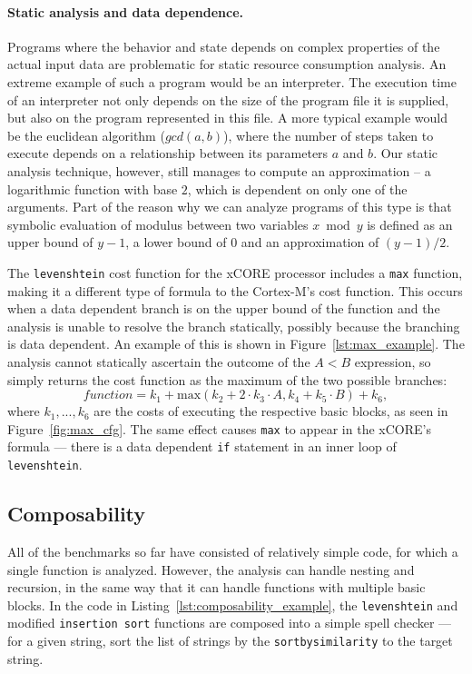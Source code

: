 \documentclass[9pt,preprint]{sigplanconf}
\newcommand{\figref}[1]{Figure~\ref{fig:#1}}
\begin{document}
\paragraph{Static analysis and data dependence.}
Programs where the behavior and state depends on complex properties of the
actual input data are problematic for static resource consumption
analysis. An extreme example of such a program would be an
interpreter. The execution time of an interpreter not only depends on the size
of the program file it is supplied, but also on the program represented in this
file. A more typical example would be the euclidean algorithm ($gcd(a,b)$),
where the number of 
steps taken to execute depends on a relationship between its parameters
$a$ and $b$. Our static analysis technique, however, still manages to compute an
approximation -- a logarithmic function with base $2$, which is dependent on
only one of the arguments. Part of the reason why we can analyze programs of
this type is that symbolic evaluation of modulus between two variables
$x \bmod y$ is defined as an upper bound of $y-1$, a lower bound of $0$ and an
approximation of $(y-1)/2$.

The \texttt{levenshtein} cost function for the xCORE processor includes a
\texttt{max} function, making it a different type of formula to the Cortex-M's
cost function. This occurs when a data dependent branch is on the upper bound of
the function and the analysis is unable to resolve the branch statically,
possibly because the branching is data dependent. An example of this is shown in
Figure~\ref{lst:max_example}. The analysis cannot statically ascertain the
outcome of the $A < B$ expression, so simply returns the cost function as the
maximum of the two possible branches:
\begin{equation*}
  function=k_1+\textrm{max}(k_2 + 2\cdot k_3\cdot A, k_4+k_5\cdot B)+k_6,
\end{equation*}
where $k_1,...,k_6$ are the costs of executing the respective basic blocks, as
seen in \figref{max_cfg}. The same effect causes
\texttt{max} to appear in the xCORE's formula --- there is a data dependent
\texttt{if} statement in an inner loop of \texttt{levenshtein}.

\subsection{Composability}
All of the benchmarks so far have consisted of relatively simple code, for which
a single function is analyzed. However, the analysis can handle nesting and
recursion, in the same way that it can handle functions with multiple basic
blocks. In the code in Listing~\ref{lst:composability_example}, the
\texttt{levenshtein} and modified \texttt{insertion sort} functions are composed into a
simple spell checker --- for a given string, sort
the list of strings by the \texttt{sortbysimilarity} to the target string.
\end{document}
